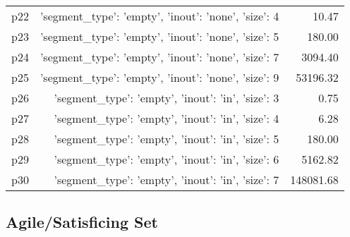 \documentclass{article}
\begin{document}
\begin{center}
\begin{tabular}{@{}l|r|r@{}}
  p22&{'segment\_type': 'empty', 'inout': 'none', 'size': 4}&10.47\\
  p23&{'segment\_type': 'empty', 'inout': 'none', 'size': 5}&180.00\\
  p24&{'segment\_type': 'empty', 'inout': 'none', 'size': 7}&3094.40\\
  p25&{'segment\_type': 'empty', 'inout': 'none', 'size': 9}&53196.32\\
  p26&{'segment\_type': 'empty', 'inout': 'in', 'size': 3}&0.75\\
  p27&{'segment\_type': 'empty', 'inout': 'in', 'size': 4}&6.28\\
  p28&{'segment\_type': 'empty', 'inout': 'in', 'size': 5}&180.00\\
  p29&{'segment\_type': 'empty', 'inout': 'in', 'size': 6}&5162.82\\
  p30&{'segment\_type': 'empty', 'inout': 'in', 'size': 7}&148081.68
                            \end{tabular}
                            \end{center}
                    

                                \subsection*{Agile/Satisficing Set}
                                
\end{document}
